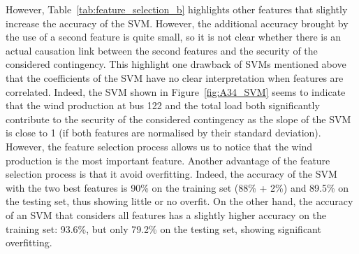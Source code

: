 However, Table~\ref{tab:feature_selection_b} highlights other features that slightly increase the accuracy of the SVM. However, the additional accuracy brought by the use of a second feature is quite small, so it is not clear whether there is an actual causation link between the second features and the security of the considered contingency. This highlight one drawback of SVMs mentioned above that the coefficients of the SVM have no clear interpretation when features are correlated. Indeed, the SVM shown in Figure~\ref{fig:A34_SVM} seems to indicate that the wind production at bus 122 and the total load both significantly contribute to the security of the considered contingency as the slope of the SVM is close to 1 (if both features are normalised by their standard deviation). However, the feature selection process allows us to notice that the wind production is the most important feature. Another advantage of the feature selection process is that it avoid overfitting. Indeed, the accuracy of the SVM with the two best features is 90\% on the training set (88\% + 2\%) and 89.5\% on the testing set, thus showing little or no overfit. On the other hand, the accuracy of an SVM that considers all features has a slightly higher accuracy on the training set: 93.6\%, but only 79.2\% on the testing set, showing significant overfitting.

%


